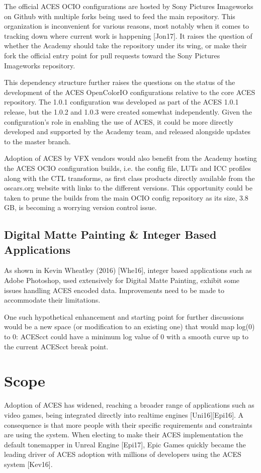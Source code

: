 \documentclass[conference]{IEEEtran}
\begin{document}
The official ACES OCIO configurations are hosted by Sony Pictures Imageworks on Github with multiple forks being used to feed the main repository. This organization is inconvenient for various reasons, most notably when it comes to tracking down where current work is happening [Jon17]. It raises the question of whether the Academy should take the repository under its wing, or make their fork the official entry point for pull requests toward the Sony Pictures Imageworks repository.

This dependency structure further raises the questions on the status of the development of the ACES OpenColorIO configurations relative to the core ACES repository. The 1.0.1 configuration was developed as part of the ACES 1.0.1 release, but the 1.0.2 and 1.0.3 were created somewhat independently. Given the configuration's role in enabling the use of ACES, it could be more directly developed and supported by the Academy team, and released alongside updates to the master branch.

Adoption of ACES by VFX vendors would also benefit from the Academy hosting the ACES OCIO configuration builds, i.e. the config file, LUTs and ICC profiles along with the CTL transforms, as first class products directly available from the oscars.org website with links to the different versions. This opportunity could be taken to prune the builds from the main OCIO config repository as its size, 3.8 GB, is becoming a worrying version control issue.

\subsection{Digital Matte Painting \& Integer Based Applications}
As shown in Kevin Wheatley (2016) [Whe16], integer based applications such as Adobe Photoshop, used extensively for Digital Matte Painting, exhibit some issues handling ACES encoded data. Improvements need to be made to accommodate their limitations.

One such hypothetical enhancement and starting point for further discussions would be a new space (or modification to an existing one) that would map log(0) to 0: ACEScct could have a minimum log value of 0 with a smooth curve up to the current ACEScct break point.

\section{Scope}
Adoption of ACES has widened, reaching a broader range of applications such as video games, being integrated directly into realtime engines [Uni16][Epi16]. A consequence is that more people with their specific requirements and constraints are using the system. When electing to make their ACES implementation the default tonemapper in Unreal Engine [Epi17], Epic Games quickly became the leading driver of ACES adoption with millions of developers using the ACES system [Kev16].
\end{document}
